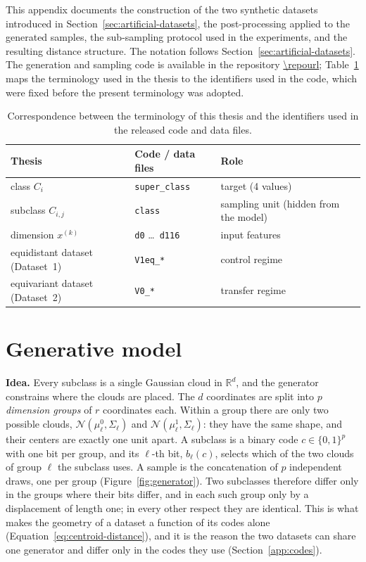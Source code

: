 \documentclass[../ppgc-tese.tex]{subfiles}
\begin{document}
This appendix documents the construction of the two synthetic datasets introduced in Section~\ref{sec:artificial-datasets}, the post-processing applied to the generated samples, the sub-sampling protocol used in the experiments, and the resulting distance structure. The notation follows Section~\ref{sec:artificial-datasets}. The generation and sampling code is available in the repository \url{\repourl}; Table~\ref{tab:terminology} maps the terminology used in the thesis to the identifiers used in the code, which were fixed before the present terminology was adopted.

\begin{table}[ht]
    \centering
    \caption{Correspondence between the terminology of this thesis and the identifiers used in the released code and data files.}
    \label{tab:terminology}
    \small
    \begin{tabular}{lll}
        \toprule
        Thesis & Code / data files & Role \\
        \midrule
        class $C_i$ & \texttt{super\_class} & target (4 values) \\
        subclass $C_{i,j}$ & \texttt{class} & sampling unit (hidden from the model) \\
        dimension $x^{(k)}$ & \texttt{d0} \dots\ \texttt{d116} & input features \\
        equidistant dataset (Dataset~1) & \texttt{V1eq\_*} & control regime \\
        equivariant dataset (Dataset~2) & \texttt{V0\_*} & transfer regime \\
        \bottomrule
    \end{tabular}
\end{table}

\section{Generative model}\label{app:generator}

\noindent\textbf{Idea.}
Every subclass is a single Gaussian cloud in $\mathbb{R}^d$, and the generator constrains where the clouds are placed. The $d$ coordinates are split into $p$ \emph{dimension groups} of $r$ coordinates each. Within a group there are only two possible clouds, $\mathcal{N}(\mu_\ell^0, \Sigma_\ell)$ and $\mathcal{N}(\mu_\ell^1, \Sigma_\ell)$: they have the same shape, and their centers are exactly one unit apart. A subclass is a binary code $c \in \{0,1\}^p$ with one bit per group, and its $\ell$-th bit, $b_\ell(c)$, selects which of the two clouds of group $\ell$ the subclass uses. A sample is the concatenation of $p$ independent draws, one per group (Figure~\ref{fig:generator}). Two subclasses therefore differ only in the groups where their bits differ, and in each such group only by a displacement of length one; in every other respect they are identical. This is what makes the geometry of a dataset a function of its codes alone (Equation~\ref{eq:centroid-distance}), and it is the reason the two datasets can share one generator and differ only in the codes they use (Section~\ref{app:codes}).
\end{document}
